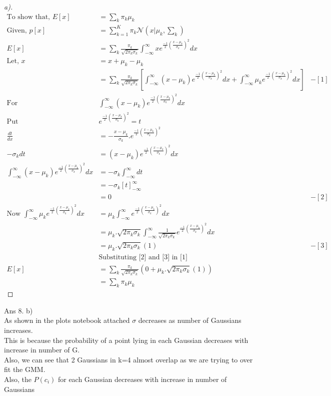 \documentclass[12pt]{article}
\newenvironment{theorem}[2][Theorem]{\begin{trivlist}
\item[\hskip \labelsep {\bfseries #1}\hskip \labelsep {\bfseries #2.}]}{\end{trivlist}}
\begin{document}
\pagebreak
\begin{theorem}[Ans]{7}
\begin{proof}[a)]
\begin{align*}
\text{To show that, }E[x] &= \sum_{k}\pi_{k}\mu_{k} \\
\text{Given, }p[x] &= \sum_{k=1}^{K}\pi_{k}\mathcal{N}(x|\mu_{k},\sum_{k})\\
E[x] &= \sum_{k}\frac{\pi_{k}}{\sqrt{2\pi_{k}\sigma_{k}}}\int_{-\infty}^{\infty}xe^{\frac{-1}{2}(\frac{x-\mu_{k}}{\sigma_{k}})^{2}}dx\\
\text{Let, }x&=x+\mu_{k}-\mu_{k}\\
&=\sum_{k}\frac{\pi_{k}}{\sqrt{2\pi_{k}\sigma_{k}}}[\int_{-\infty}^{\infty}(x-\mu_{k})e^{\frac{-1}{2}(\frac{x-\mu_{k}}{\sigma_{k}})^{2}}dx+\int_{-\infty}^{\infty}\mu_{k}e^{\frac{-1}{2}(\frac{x-\mu_{k}}{\sigma_{k}})^{2}}dx] &- [1]\\
\text{For }&\int_{-\infty}^{\infty}(x-\mu_{k})e^{\frac{-1}{2}(\frac{x-\mu_{k}}{\sigma_{k}})^{2}}dx\\
\text{Put }& e^{\frac{-1}{2}(\frac{x-\mu_{k}}{\sigma_{k}})^{2}}=t\\
\frac{dt}{dx} &= -\frac{x-\mu_{k}}{\sigma_{k}}.e^{\frac{-1}{2}(\frac{x-\mu_{k}}{\sigma_{k}})^{2}} \\
-\sigma_{k}dt &= (x-\mu_{k})e^{\frac{-1}{2}(\frac{x-\mu_{k}}{\sigma_{k}})^{2}}dx\\
\int_{-\infty}^{\infty}(x-\mu_{k})e^{\frac{-1}{2}(\frac{x-\mu_{k}}{\sigma_{k}})^{2}}dx &= -\sigma_{k}\int_{-\infty}^{\infty}dt\\
&= -\sigma_{k}[t]_{-\infty}^{\infty}\\
&= 0 &- [2]\\
\text{Now }\int_{-\infty}^{\infty}\mu_{k}e^{\frac{-1}{2}(\frac{x-\mu_{k}}{\sigma_{k}})^{2}}dx&= \mu_{k}\int_{-\infty}^{\infty}e^{\frac{-1}{2}(\frac{x-\mu_{k}}{\sigma_{k}})^{2}}dx\\
&=\mu_{k}.\sqrt{2\pi_{k}\sigma_{k}}\int_{-\infty}^{\infty}\frac{1}{\sqrt{2\pi_{k}\sigma_{k}}}e^{\frac{-1}{2}(\frac{x-\mu_{k}}{\sigma_{k}})^{2}}dx\\
&=\mu_{k}.\sqrt{2\pi_{k}\sigma_{k}}(1) & -[3]\\
&\text{Substituting [2] and [3] in [1]}\\
E[x]&=\sum_{k}\frac{\pi_{k}}{\sqrt{2\pi_{k}\sigma_{k}}}(0+\mu_{k}.\sqrt{2\pi_{k}\sigma_{k}}(1))\\
&=\sum_{k}\pi_{k}\mu_{k}
\end{align*}
\end{proof}
\end{theorem}
Ans 8. b)\\
As shown in the plots notebook attached $\sigma$ decreases as number of Gaussians increases. \\
This is because the probability of a point lying in each Gaussian decreases with increase in number of G.\\
Also, we can see that 2 Gaussians in k=4 almost overlap as we are trying to over fit the GMM.\\
Also, the $P(c_{i})$ for each Gaussian decreases with increase in number of Gaussians

 
\end{document}
